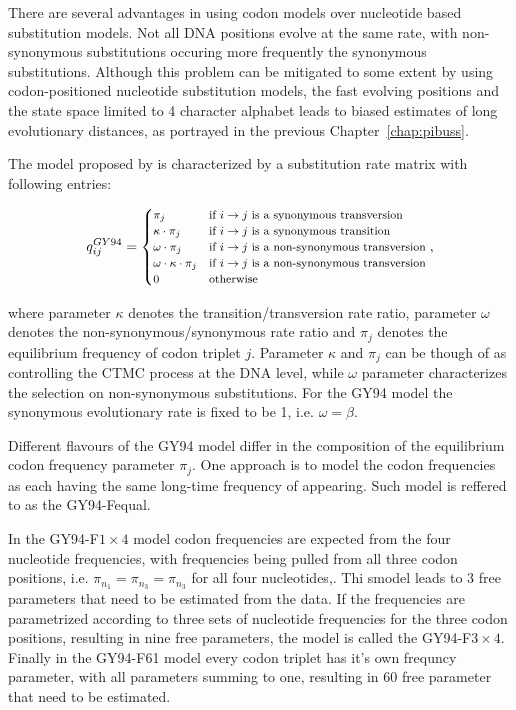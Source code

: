 There are several advantages in using codon models over nucleotide based substitution models.
Not all DNA positions evolve at the same rate, with non-synonymous substitutions occuring more frequently the synonymous substitutions.
Although this problem can be mitigated to some extent by using codon-positioned nucleotide substitution models, the fast evolving positions and the state space limited to 4 character alphabet leads to biased estimates of long evolutionary distances, as portrayed in the previous Chapter~\ref{chap:pibuss}.

The model proposed by \cite{Goldman1994} is characterized by a substitution rate matrix with following entries:

\begin{equation}
\footnotesize{
q_{ij}^{GY94}=\begin{cases}
\pi_{j} & \text{if \ensuremath{i\rightarrow j} is a synonymous transversion}\\
\kappa\cdot\pi_{j} & \text{if \ensuremath{i\rightarrow j} is a synonymous transition}\\
\omega\cdot\pi_{j} & \text{if \ensuremath{i\rightarrow j} is a non-synonymous transversion}\\
\omega\cdot\kappa\cdot\pi_{j} & \text{if \ensuremath{i\rightarrow j} is a non-synonymous transversion}\\
0 & \text{otherwise}
\end{cases},
} %
\label{eq:gy94}
\end{equation}

\noindent
where parameter $\kappa$ denotes the transition/transversion rate ratio, parameter $\omega$ denotes the non-synonymous/synonymous
rate ratio and $\pi_j$ denotes the equilibrium frequency of codon triplet $j$.
Parameter $\kappa$ and $\pi_j$ can be though of as controlling the CTMC process at the DNA level, while $\omega$ parameter characterizes the selection on non-synonymous substitutions.
For the GY94 model the synonymous evolutionary rate is fixed to be 1, i.e. $\omega=\beta$.

Different flavours of the GY94 model differ in the composition of the equilibrium codon frequency parameter $\pi_{j}$.
One approach is to model the codon frequencies as each having the same long-time frequency of appearing. 
Such model is reffered to as the GY94-Fequal.

In the GY94-F$1\times4$ model codon frequencies are expected from the four nucleotide frequencies, with frequencies being pulled from all three codon positions, i.e. $\pi_{n_{1}}=\pi_{n_{3}}=\pi_{n_{3}}$ for all four nucleotides,.
Thi smodel leads to 3 free parameters that need to be estimated from the data.
If the frequencies are parametrized according to three sets of nucleotide frequencies for the three codon positions, resulting in nine free parameters, the model is called the GY94-F$3\times4$.
Finally in the GY94-F61 model every codon triplet has it's own frequncy parameter, with all parameters summing to one, resulting in 60 free parameter that need to be estimated.

